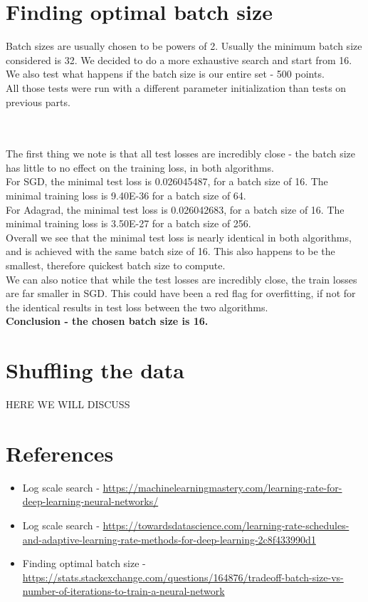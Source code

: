 \documentclass[12pt]{scrartcl}
\begin{document}
\section{Finding optimal batch size}
Batch sizes are usually chosen to be powers of 2. Usually the minimum batch size considered is 32. We decided to do a more exhaustive search and start from 16. We also test what happens if the batch size is our entire set - 500 points.\\
All those tests were run with a different parameter initialization than tests on previous parts.

\\\\

The first thing we note is that all test losses are incredibly close - the batch size has little to no effect on the training loss, in both algorithms.\\
For SGD, the minimal test loss is 0.026045487, for a batch size of 16. The minimal training loss is 9.40E-36 for a batch size of 64.\\
For Adagrad, the minimal test loss is 0.026042683, for a batch size of 16. The minimal training loss is 3.50E-27 for a batch size of 256.\\
Overall we see that the minimal test loss is nearly identical in both algorithms, and is achieved with the same batch size of 16. This also happens to be the smallest, therefore quickest batch size to compute.\\
We can also notice that while the test losses are incredibly close, the train losses are far smaller in SGD. This could have been a red flag for overfitting, if not for the identical results in test loss between the two algorithms.\\
\textbf{Conclusion - the chosen batch size is 16.}

\section{Shuffling the data}
HERE WE WILL DISCUSS

\section{References}
\begin{itemize}
\item Log scale search - \url{https://machinelearningmastery.com/learning-rate-for-deep-learning-neural-networks/}

\item Log scale search - \url{https://towardsdatascience.com/learning-rate-schedules-and-adaptive-learning-rate-methods-for-deep-learning-2c8f433990d1}

\item Finding optimal batch size - \url{https://stats.stackexchange.com/questions/164876/tradeoff-batch-size-vs-number-of-iterations-to-train-a-neural-network}
\end{itemize}
\end{document}
